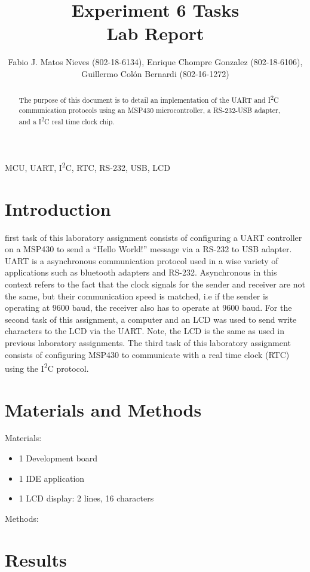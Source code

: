 \documentclass[journal]{IEEEtran}
\begin{document}
\title{Experiment 6 Tasks\\ Lab Report} \author{Fabio J. Matos
  Nieves (802-18-6134), Enrique Chompre Gonzalez (802-18-6106), \\Guillermo Colón Bernardi (802-16-1272)}
\maketitle
\begin{abstract}
  The purpose of this document is to detail an implementation of the UART and I\textsuperscript{2}C communication protocols using an MSP430 microcontroller, a RS-232-USB adapter, and a I\textsuperscript{2}C real time clock chip.
\end{abstract}
\begin{IEEEkeywords}
  MCU, UART, I\textsuperscript{2}C, RTC, RS-232, USB, LCD
\end{IEEEkeywords}
\IEEEpeerreviewmaketitle
\section{Introduction}
 first task of this laboratory assignment consists of configuring a UART controller on a MSP430 to send a ``Hello World!'' message via a RS-232 to USB adapter. UART is a asynchronous communication protocol used in a wise variety of applications such as bluetooth adapters and RS-232. Asynchronous in this context refers to the fact that the clock signals for the sender and receiver are not the same, but their communication speed is matched, i.e if the sender is operating at 9600 baud, the receiver also has to operate at 9600 baud. For the second task of this assignment, a computer and an LCD was used to send write characters to the LCD via the UART. Note, the LCD is the same as used in previous laboratory assignments. The third task of this laboratory assignment consists of configuring MSP430 to communicate with a real time clock (RTC) using the I\textsuperscript{2}C protocol.
\section{Materials and Methods}
Materials:
\begin{itemize}
  \item 1 Development board
  \item 1 IDE application
  \item 1 LCD display: 2 lines, 16 characters
\end{itemize}
Methods:\\
\section{Results}
\nocite{rojasEmbeddedSystemsDesign2016}
\nocite{LCDControllerDatasheets}


\end{document}
